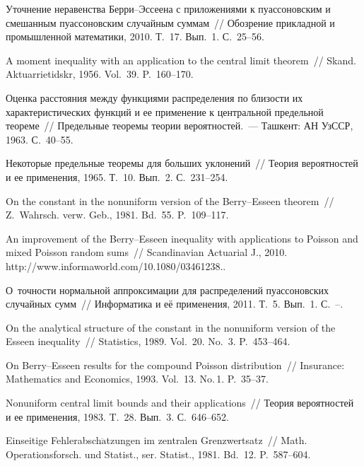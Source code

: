 \begin{multicols}{2}
{{\begin{thebibliography}{99}
 Уточнение неравенства
Берри--Эссеена с приложениями к пуассоновским и смешанным
пуассоновским случайным суммам~// Обозрение прикладной и
промышленной математики, 2010. Т.~17. Вып.~1. С.~25--56.

  
A moment inequality with an application to
the central limit theorem~// Skand. Aktuarrietidskr, 1956. Vol.~39.
P.~160--170.

  Оценка расстояния между
функциями распределения по близости их характеристических функций
и ее применение к центральной предельной теореме~// Предельные
теоремы теории вероятностей.~--- Ташкент: АН УзССР, 1963. С.~40--55.

  Некоторые предельные теоремы для больших
уклонений~// Теория вероятностей и ее применения, 1965. Т.~10.
Вып.~2. С.~231--254.

  On the constant in the nonuniform version of the
Berry--Esseen theorem~// Z.~Wahrsch. verw. Geb., 1981. Bd.~55. P.~109--117.

  An improvement of the
Berry--Esseen inequality with applications to Poisson and mixed
Poisson random sums~// Scandinavian Actuarial J., 2010.
{\sf http://www.informaworld.com/10.1080/03461238.}.

  О~точности нормальной
аппроксимации для распределений пуассоновских случайных сумм~//
Информатика и её применения, 2011. Т.~5. Вып.~1. С.~\pageref{nefedova1}--\pageref{end-nefedova}.

  On the analytical structure of the constant in
the nonuniform version of the Esseen inequality~// Statistics, 1989. Vol.~20. No.~3. P.~453--464.

  On Berry--Esseen results for the compound
Poisson distribution~// Insurance: Mathematics and Economics,
1993. Vol.~13. No.\,1. P.~35--37.

  Nonuniform central limit bounds and their
applications~// Теория вероятностей и ее применения, 1983. T.~28.
Вып.~3. С.~646--652.

  Einseitige Fehlerabsch$\ddot{\mbox{a}}$tzungen im zentralen
Grenzwertsatz~// Math. Operationsforsch. und Statist., ser.
Statist., 1981. Bd.~12. P.~587--604.


\end{thebibliography}}}
\end{multicols}
